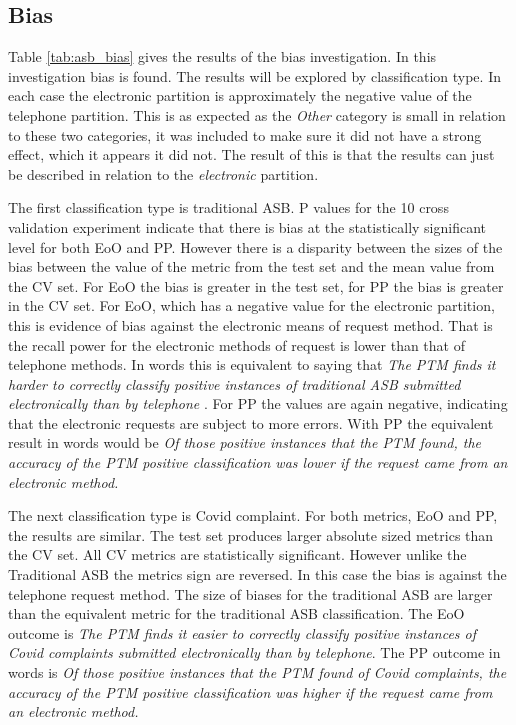 \subsection{Bias} 
Table \ref{tab:asb_bias} gives the results of the bias investigation. In this investigation bias is found. The results will be explored by classification type. In each case the electronic partition is approximately the negative value of the telephone partition. This is as expected as the \emph{Other} category is small in relation to these two categories, it was included to make sure it did not have a strong effect, which it appears it did not. The result of this is that the results can just be described in relation to the \emph{electronic} partition. 


The first classification type is traditional ASB. P values for the 10 cross validation experiment indicate that there is bias at the statistically significant level for both EoO and PP. However there is a disparity between the sizes of the bias between the value of the metric from the test set and the mean value from the CV set. For EoO the bias is greater in the test set, for PP the bias is greater in the CV set. For EoO, which has a negative value for the electronic partition, this is evidence of bias against the electronic means of request method. That is the recall power for the electronic methods of request is lower than that of telephone methods. In words this is equivalent to saying that \emph{The PTM finds it harder to correctly classify positive instances of traditional ASB submitted electronically than by telephone} . For PP the values are again negative, indicating that the electronic requests are subject to more errors. With PP the equivalent result in words would be \emph{Of those positive instances that the PTM found, the accuracy of the PTM positive classification was lower if the request came from an electronic method. }

The next classification type is Covid complaint. For both metrics, EoO and PP, the results are similar. The test set produces larger absolute sized metrics than the CV set. All CV metrics are statistically significant. However unlike the Traditional ASB the metrics sign are reversed. In this case the bias is against the telephone request method. The size of biases for the traditional ASB are larger than the equivalent metric for the traditional ASB classification. The EoO outcome is \emph{The PTM finds it easier to correctly classify positive instances of Covid complaints submitted electronically than by telephone}. The PP outcome in words is \emph{Of those positive instances that the PTM found of Covid complaints, the accuracy of the PTM positive classification was higher if the request came from an electronic method.}     


